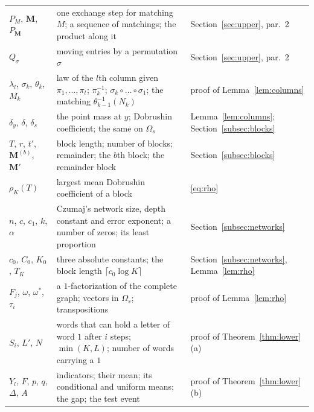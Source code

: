 \documentclass[11pt]{amsart}
\theoremstyle{remark}
\numberwithin{equation}{section}
\begin{document}
\begin{center}
\begin{tabular}{p{}p{}p{}}
$P_M$, $\mathbf M$, $P_{\mathbf M}$ & one exchange step for matching $M$; a sequence of matchings; the product along it & Section~\ref{sec:upper}, par.~2\\
$Q_\sigma$ & moving entries by a permutation $\sigma$ & Section~\ref{sec:upper}, par.~2\\
$\lambda_l$, $\sigma_k$, $\theta_k$, $M_k$ & law of the $l$th column given $\pi_1,\dots,\pi_t$; $\pi_k^{-1}$; $\sigma_k\circ\dots\circ\sigma_1$; the matching $\theta_{k-1}^{-1}(N_k)$ & proof of Lemma~\ref{lem:columns}\\
$\delta_y$, $\delta$, $\delta_s$ & the point mass at $y$; Dobrushin coefficient; the same on $\Omega_s$ & Lemma~\ref{lem:columns}; Section~\ref{subsec:blocks}\\
$T$, $r$, $t'$, $\mathbf M^{(b)}$, $\mathbf M'$ & block length; number of blocks; remainder; the $b$th block; the remainder block & Section~\ref{subsec:blocks}\\
$\rho_K(T)$ & largest mean Dobrushin coefficient of a block & \eqref{eq:rho}\\
$n$, $c$, $c_1$, $k$, $\alpha$ & Czumaj's network size, depth constant and error exponent; a number of zeros; its least proportion & Section~\ref{subsec:networks}\\
$c_0$, $C_0$, $K_0$, $T_K$ & three absolute constants; the block length $\lceil c_0\log K\rceil$ & Section~\ref{subsec:networks}, Lemma~\ref{lem:rho}\\
$F_j$, $\omega$, $\omega^*$, $\tau_i$ & a $1$-factorization of the complete graph; vectors in $\Omega_s$; transpositions & proof of Lemma~\ref{lem:rho}\\
$S_i$, $L'$, $N$ & words that can hold a letter of word $1$ after $i$ steps; $\min(K,L)$; number of words carrying a $1$ & proof of Theorem~\ref{thm:lower}(a)\\
$Y_l$, $F$, $p$, $q$, $\Delta$, $A$ & indicators; their mean; its conditional and uniform means; the gap; the test event & proof of Theorem~\ref{thm:lower}(b)\\\bottomrule
\end{tabular}
\end{center}
\end{document}
